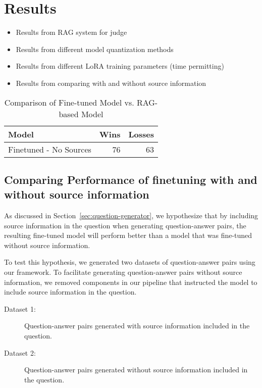 \section{Results}\label{sec:results}

\begin{itemize}
    \item Results from RAG system for judge
    \item Results from different model quantization methods
    \item Results from different LoRA training parameters (time permitting)
    \item Results from comparing with and without source information
\end{itemize}

\begin{table}[h]
\centering
\caption{Comparison of Fine-tuned Model vs. RAG-based Model}
\begin{tabular}{lrr}
\hline
Model & Wins & Losses \\
\hline
Finetuned - No Sources & 76 & 63 \\
\hline
\end{tabular}
\label{tab:finetuned-vs-base}
\end{table}

\subsection{Comparing Performance of finetuning with and without source information}


As discussed in Section~\ref{sec:question-generator}, we hypothesize that by including source information 
in the question when generating question-answer pairs, the resulting fine-tuned model will perform 
better than a model that was fine-tuned without source information. 

To test this hypothesis, we generated two datasets of question-answer pairs using our framework. 
To facilitate generating question-answer pairs without source information, we removed components in our pipeline 
that instructed the model to include source information in the question.
\begin{description}
    \item[Dataset 1:] Question-answer pairs generated with source information included in the question.
    \item[Dataset 2:] Question-answer pairs generated without source information included in the question.
\end{description}

